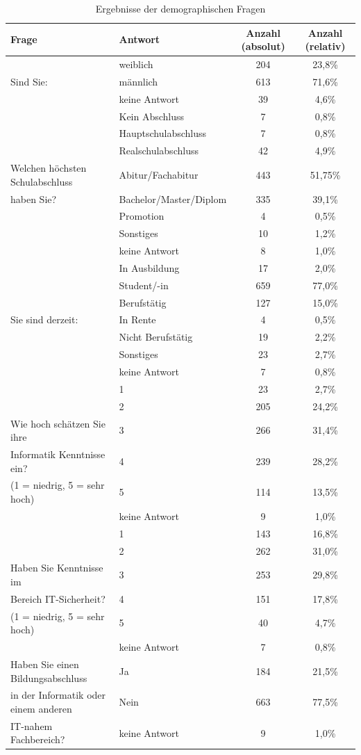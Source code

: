 \begin{table}
	\begin{tabular}[]{ l | l | c | c }
	\hline
	Frage & Antwort & Anzahl (absolut) & Anzahl (relativ) \\
	\hline
	& weiblich &  204 & 23,8\% \\
	Sind Sie:& männlich & 613 & 71,6\% \\
	& keine Antwort & 39 & 4,6\% \\
	\hline \hline
	& Kein Abschluss & 7 & 0,8\% \\
	& Hauptschulabschluss & 7 & 0,8\% \\
	& Realschulabschluss & 42 & 4,9\% \\
	Welchen höchsten Schulabschluss& Abitur/Fachabitur & 443 & 51,75\% \\
	haben Sie? & Bachelor/Master/Diplom & 335 & 39,1\% \\
	& Promotion & 4 & 0,5\% \\
	& Sonstiges & 10 & 1,2\% \\
	& keine Antwort & 8 & 1,0\% \\
	\hline \hline
	& In Ausbildung & 17 & 2,0\% \\
	& Student/-in & 659 & 77,0\% \\
	& Berufstätig & 127 & 15,0\%\\
	Sie sind derzeit: & In Rente & 4 & 0,5\% \\
	& Nicht Berufstätig & 19 & 2,2\% \\
	& Sonstiges & 23 & 2,7\% \\
	& keine Antwort & 7 & 0,8\% \\
	\hline \hline
	& 1 & 23 & 2,7\%\\
	& 2 & 205 & 24,2\% \\
	Wie hoch schätzen Sie ihre & 3 & 266 & 31,4\% \\
	Informatik Kenntnisse ein? & 4 & 239 & 28,2\% \\
	(1 = niedrig, 5 = sehr hoch)& 5 & 114 & 13,5\% \\
	& keine Antwort & 9 & 1,0\% \\
	\hline \hline
	& 1 & 143 & 16,8\% \\
	& 2 & 262 & 31,0\% \\
	Haben Sie Kenntnisse im& 3 & 253 & 29,8\% \\
	Bereich IT-Sicherheit?& 4 & 151 & 17,8\% \\
	(1 = niedrig, 5 = sehr hoch)& 5 & 40 & 4,7\% \\
	& keine Antwort & 7 & 0,8\% \\
	\hline \hline
	Haben Sie einen Bildungsabschluss & Ja & 184 & 21,5\% \\
	in der Informatik oder einem anderen & Nein & 663 & 77,5\%\\
	IT-nahem Fachbereich? & keine Antwort & 9 & 1,0\% \\
	\hline
	\end{tabular}
	\caption{Ergebnisse der demographischen Fragen}\label{demoqna}
\end{table}
